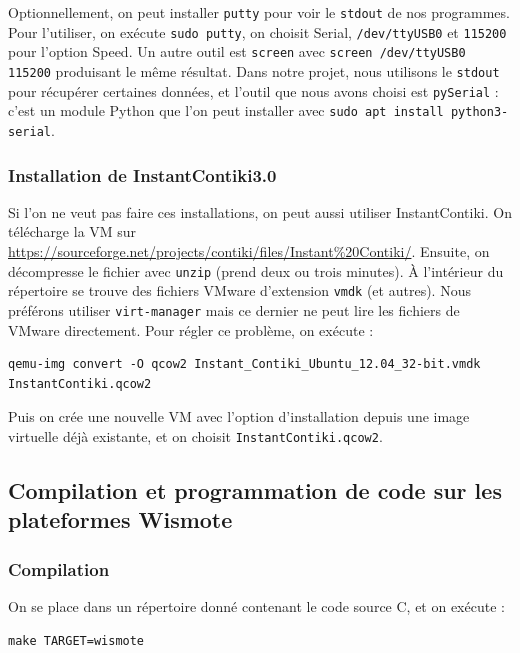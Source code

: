 \documentclass[french, a4paper, 12pt, parskip]{scrartcl}
\begin{document}
Optionnellement, on peut installer \verb+putty+ pour voir le \verb+stdout+ de
nos programmes. Pour l'utiliser, on exécute \verb+sudo putty+, on choisit
\og{}Serial\fg{}, \verb+/dev/ttyUSB0+ et \verb+115200+ pour l'option
\og{}Speed\fg{}. Un autre outil est \verb+screen+ avec
\verb+screen /dev/ttyUSB0 115200+ produisant le même résultat. Dans notre
projet, nous utilisons le \verb+stdout+ pour récupérer certaines données, et
l'outil que nous avons choisi est \verb+pySerial+ : c'est un module Python que
l'on peut installer avec \verb+sudo apt install python3-serial+.

\subsubsection{Installation de InstantContiki3.0}

Si l'on ne veut pas faire ces installations, on peut aussi utiliser
InstantContiki. On télécharge la VM sur
\url{https://sourceforge.net/projects/contiki/files/Instant\%20Contiki/}.
Ensuite, on décompresse le fichier avec \verb+unzip+ (prend deux ou trois
minutes). À l'intérieur du répertoire se trouve des fichiers VMware d'extension
\verb+vmdk+ (et autres). Nous préférons utiliser \verb+virt-manager+ mais ce
dernier ne peut lire les fichiers de VMware directement. Pour régler ce
problème, on exécute :
\begin{verbatim}
qemu-img convert -O qcow2 Instant_Contiki_Ubuntu_12.04_32-bit.vmdk InstantContiki.qcow2
\end{verbatim}

Puis on crée une nouvelle VM avec l'option d'installation depuis une image
virtuelle déjà existante, et on choisit \verb+InstantContiki.qcow2+.

\subsection{Compilation et programmation de code sur les plateformes Wismote}
\label{subsec:contiki-usage}

\subsubsection{Compilation}

On se place dans un répertoire donné contenant le code source C, et on exécute :
\begin{verbatim}
make TARGET=wismote
\end{verbatim}
\end{document}
